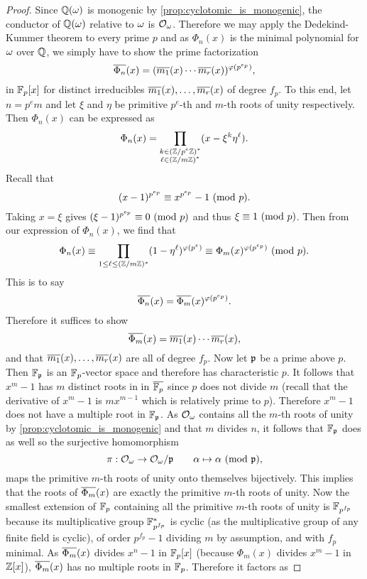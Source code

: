     \begin{proof}
      Since $\mathbb{Q}(\omega)$ is monogenic by \cref{prop:cyclotomic_is_monogenic}, the conductor of $\mathbb{Q}(\omega)$ relative to $\omega$ is $\mathcal{O}_{\omega}$. Therefore we may apply the Dedekind-Kummer theorem to every prime $p$ and as $\Phi_{n}(x)$ is the minimal polynomial for $\omega$ over $\mathbb{Q}$, we simply have to show the prime factorization
      \[
        \overline{\Phi_{n}}(x) = (\overline{m_{1}}(x) \cdots \overline{m_{r}}(x))^{\varphi(p^{e_{p}})},
      \]
      in $\mathbb{F}_{p}[x]$ for distinct irreducibles $\overline{m_{1}}(x),\ldots,\overline{m_{r}}(x)$ of degree $f_{p}$. To this end, let $n = p^{e}m$ and let $\xi$ and $\eta$ be primitive $p^{e}$-th and $m$-th roots of unity respectively. Then $\Phi_{n}(x)$ can be expressed as
      \[
        \Phi_{n}(x) = \prod_{\substack{k \in (\mathbb{Z}/p^{e}\mathbb{Z})^{\ast} \\ \ell \in (\mathbb{Z}/m\mathbb{Z})^{\ast}}}(x-\xi^{k}\eta^{\ell}).
      \]
      Recall that
      \[
        (x-1)^{p^{e_{p}}} \equiv x^{p^{e_{p}}}-1 \ (\mathrm{mod}\text{ }p).
      \]
      Taking $x = \xi$ gives $(\xi-1)^{p^{e_{p}}} \equiv 0 \ (\mathrm{mod}\text{ }p)$ and thus $\xi \equiv 1 \ (\mathrm{mod}\text{ }p)$. Then from our expression of $\Phi_{n}(x)$, we find that
      \[
        \Phi_{n}(x) \equiv \prod_{1 \le \ell \le (\mathbb{Z}/m\mathbb{Z})^{\ast}}(1-\eta^{\ell})^{\varphi(p^{e})} \equiv \Phi_{m}(x)^{\varphi(p^{e_{p}})} \ (\mathrm{mod}\text{ }p).
      \]
      This is to say
      \[
        \overline{\Phi_{n}}(x) = \overline{\Phi_{m}}(x)^{\varphi(p^{e_{p}})}.
      \]
      Therefore it suffices to show
      \[
        \overline{\Phi_{m}}(x) = \overline{m_{1}}(x) \cdots \overline{m_{r}}(x),
      \]
      and that $\overline{m_{1}}(x),\ldots,\overline{m_{r}}(x)$ are all of degree $f_{p}$. Now let $\mathfrak{p}$ be a prime above $p$. Then $\mathbb{F}_{\mathfrak{p}}$ is an $\mathbb{F}_{p}$-vector space and therefore has characteristic $p$. It follows that $x^{m}-1$ has $m$ distinct roots in in $\overline{\mathbb{F}_{p}}$ since $p$ does not divide $m$ (recall that the derivative of $x^{m}-1$ is $mx^{m-1}$ which is relatively prime to $p$). Therefore $x^{m}-1$ does not have a multiple root in $\mathbb{F}_{\mathfrak{p}}$. As $\mathcal{O}_{\omega}$ contains all the $m$-th roots of unity by \cref{prop:cyclotomic_is_monogenic} and that $m$ divides $n$, it follows that $\mathbb{F}_{\mathfrak{p}}$ does as well so the surjective homomorphism
      \[
        \pi:\mathcal{O}_{\omega} \to \mathcal{O}_{\omega}/\mathfrak{p} \qquad \alpha \mapsto \alpha \ (\mathrm{mod}\text{ }\mathfrak{p}),
      \]
      maps the primitive $m$-th roots of unity onto themselves bijectively. This implies that the roots of $\overline{\Phi_{m}}(x)$ are exactly the primitive $m$-th roots of unity. Now the smallest extension of $\mathbb{F}_{p}$ containing all the primitive $m$-th roots of unity is $\mathbb{F}_{p^{f_{p}}}$ because its multiplicative group $\mathbb{F}_{p^{f_{p}}}^{\ast}$ is cyclic (as the multiplicative group of any finite field is cyclic), of order $p^{f_{p}}-1$ dividing $m$ by assumption, and with $f_{p}$ minimal. As $\overline{\Phi_{m}}(x)$ divides $x^{n}-1$ in $\mathbb{F}_{p}[x]$ (because $\Phi_{m}(x)$ divides $x^{m}-1$ in $\mathbb{Z}[x]$), $\overline{\Phi_{m}}(x)$ has no multiple roots in $\mathbb{F}_{p}$. Therefore it factors as

\end{proof}
